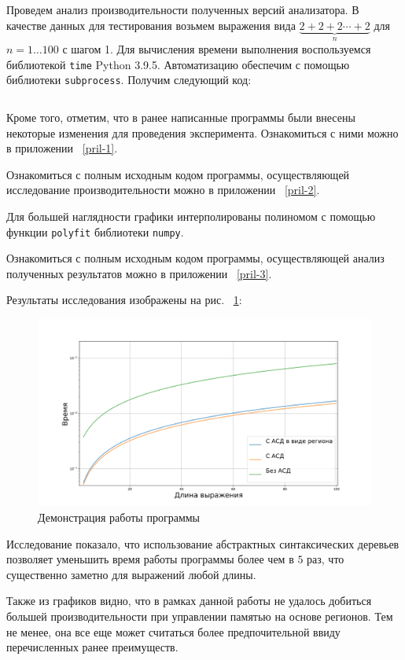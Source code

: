 \documentclass[bachelor, och, coursework]{SCWorks}
\begin{document}
Проведем анализ производительности полученных версий анализатора. В
качестве данных для тестирования возьмем выражения вида 
$\underbrace{2+2+2 \cdots+2}_{n}$
для $n = 1\dots100$ с шагом 1. Для вычисления времени выполнения 
воспользуемся библиотекой \verb"time" Python 3.9.5. Автоматизацию 
обеспечим с помощью библиотеки \verb"subprocess". Получим следующий код:

\inputminted{python}{test.py}

Кроме того, отметим, что в ранее написанные программы были внесены 
некоторые изменения для проведения эксперимента. Ознакомиться с ними
можно в приложении ~\ref{pril-1}.

Ознакомиться с полным исходным кодом программы, осуществляющей
исследование производительности можно в приложении ~\ref{pril-2}.

Для большей наглядности графики интерполированы полиномом с помощью 
функции \verb"polyfit" библиотеки \verb"numpy".

Ознакомиться с полным исходным кодом программы, осуществляющей
анализ полученных результатов можно в приложении ~\ref{pril-3}.

Результаты исследования изображены на рис. ~\ref{net2}:

\begin{figure}[!ht]
	\centering
	\includegraphics[width=20cm]{benchmark}
	\caption{Демонстрация работы программы}\label{net2}
\end{figure}

Исследование показало, что использование абстрактных синтаксических
деревьев позволяет уменьшить время работы программы более чем в $5$ раз, что
существенно заметно для выражений любой длины.

Также из графиков видно, что в рамках данной работы не удалось добиться 
большей производительности при управлении памятью на основе регионов.
Тем не менее, она все еще может считаться более предпочительной ввиду 
перечисленных ранее преимуществ.
\end{document}
